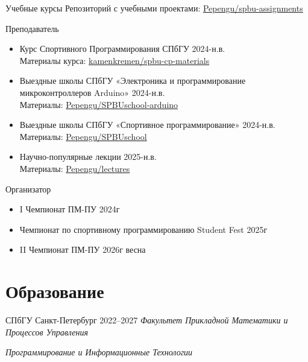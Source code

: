 \documentclass{cv}
\begin{document}
\begin{cvblock}{Учебные курсы}
    \hspace{2em} Репозиторий с учебными проектами: \href{https://github.com/Pepengu/spbu-assignments}{Pepengu/spbu-assignments}

\end{cvblock}

\begin{cvblock}{Преподаватель}
    \begin{itemize}
        \item Курс Спортивного Программирования СПбГУ 2024-н.в. \\
            Материалы курса: \href{https://github.com/kamenkremen/spbu-cp-materials}{kamenkremen/spbu-cp-materials}
        \item Выездные школы СПбГУ «Электроника и программирование микроконтроллеров Arduino» 2024-н.в. \\
            Материалы: \href{https://github.com/Pepengu/SPBUschool-arduino}{Pepengu/SPBUschool-arduino}
        \item Выездные школы СПбГУ «Спортивное программирование» 2024-н.в. \\
            Материалы: \href{https://github.com/Pepengu/SPBUschool}{Pepengu/SPBUschool}
        \item Научно-популярные лекции 2025-н.в. \\
            Материалы: \href{https://github.com/Pepengu/lectures}{Pepengu/lectures}
    \end{itemize}
\end{cvblock}

\begin{cvblock}{Организатор}
    \begin{itemize}
        \item I Чемпионат ПМ-ПУ 2024г
        \item Чемпионат по спортивному программированию Student Fest 2025г
        \item II Чемпионат ПМ-ПУ 2026г весна
    \end{itemize}
\end{cvblock}

\section{Образование}

\begin{cvblock}{%
    \blocktitle
        {СПбГУ}
        {Санкт-Петербург}
        {}
        {2022--2027}
    }
    \textit{Факультет Прикладной Математики и Процессов Управления}
    \vspace{1em}

    \textit{Программирование и Информационные Технологии}
\end{cvblock}
\end{document}
